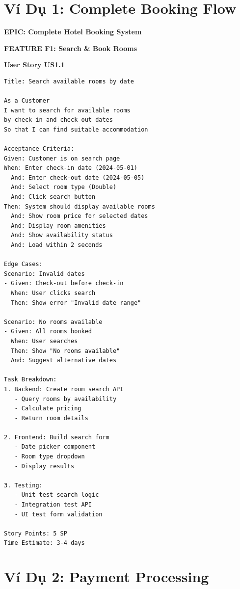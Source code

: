 \documentclass[12pt, a4paper]{report}
\begin{document}
\section{Ví Dụ 1: Complete Booking Flow}

\begin{tcolorbox}[colback=cyan!5, colframe=cyan!50]
\textbf{EPIC: Complete Hotel Booking System}

\textbf{FEATURE F1: Search \& Book Rooms}

\textbf{User Story US1.1}
\begin{lstlisting}
Title: Search available rooms by date

As a Customer
I want to search for available rooms 
by check-in and check-out dates
So that I can find suitable accommodation

Acceptance Criteria:
Given: Customer is on search page
When: Enter check-in date (2024-05-01)
  And: Enter check-out date (2024-05-05)
  And: Select room type (Double)
  And: Click search button
Then: System should display available rooms
  And: Show room price for selected dates
  And: Display room amenities
  And: Show availability status
  And: Load within 2 seconds

Edge Cases:
Scenario: Invalid dates
- Given: Check-out before check-in
  When: User clicks search
  Then: Show error "Invalid date range"

Scenario: No rooms available
- Given: All rooms booked
  When: User searches
  Then: Show "No rooms available"
  And: Suggest alternative dates

Task Breakdown:
1. Backend: Create room search API
   - Query rooms by availability
   - Calculate pricing
   - Return room details
   
2. Frontend: Build search form
   - Date picker component
   - Room type dropdown
   - Display results
   
3. Testing:
   - Unit test search logic
   - Integration test API
   - UI test form validation

Story Points: 5 SP
Time Estimate: 3-4 days
\end{lstlisting}
\end{tcolorbox}

\section{Ví Dụ 2: Payment Processing}
\end{document}
